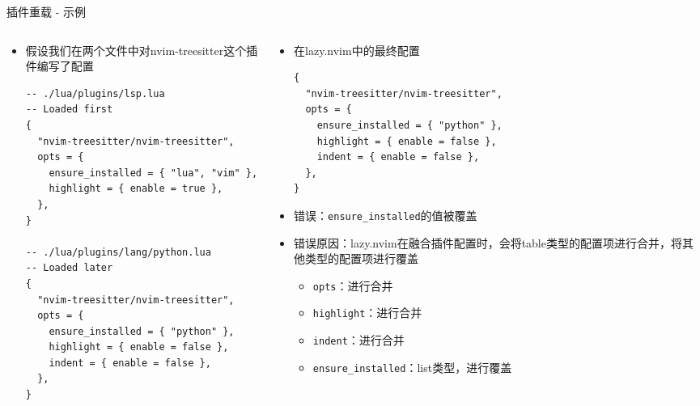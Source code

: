 \documentclass[aspectratio=169]{ctexbeamer}
\begin{document}
\begin{frame}[fragile]{插件重载 - 示例}
  \begin{columns}
    \fontsize{8pt}{10pt}\selectfont

    \begin{column}[t]{0.5\linewidth}
      \begin{itemize}
        \item 假设我们在两个文件中对nvim-treesitter这个插件编写了配置
          \begin{lstlisting}[basicstyle=\tiny\ttfamily]
-- ./lua/plugins/lsp.lua
-- Loaded first
{
  "nvim-treesitter/nvim-treesitter",
  opts = {
    ensure_installed = { "lua", "vim" },
    highlight = { enable = true },
  },
}

-- ./lua/plugins/lang/python.lua
-- Loaded later
{
  "nvim-treesitter/nvim-treesitter",
  opts = {
    ensure_installed = { "python" },
    highlight = { enable = false },
    indent = { enable = false },
  },
}
          \end{lstlisting}
      \end{itemize}
    \end{column}

    \begin{column}[t]{0.5\linewidth}
      \begin{itemize}
        \item 在lazy.nvim中的最终配置
          \begin{lstlisting}[basicstyle=\tiny\ttfamily]
{
  "nvim-treesitter/nvim-treesitter",
  opts = {
    ensure_installed = { "python" },
    highlight = { enable = false },
    indent = { enable = false },
  },
}
          \end{lstlisting}
        \item 错误：\lstinline{ensure_installed}的值被覆盖
        \item 错误原因：lazy.nvim在融合插件配置时，会将table类型的配置项进行合并，将其他类型的配置项进行覆盖
          \begin{itemize}
            \item \lstinline{opts}：进行合并
            \item \lstinline{highlight}：进行合并
            \item \lstinline{indent}：进行合并
            \item \lstinline{ensure_installed}：list类型，进行覆盖
          \end{itemize}
      \end{itemize}
    \end{column}
  \end{columns}
\end{frame}
\end{document}
